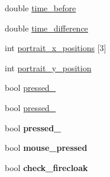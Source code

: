 \begin{DoxyCompactItemize}
\item 
double \hyperlink{classc__map_ab59ec9afe1f17edc59308fe5392b99bd}{time\-\_\-before}
\item 
double \hyperlink{classc__map_a7a1d7aaf2dafa841ec84f9b6aa256b5b}{time\-\_\-difference}
\item 
int \hyperlink{classc__map_aeb595cd9e54fd327225d36119f128496}{portrait\-\_\-x\-\_\-positions} \mbox{[}3\mbox{]}
\item 
int \hyperlink{classc__map_abd86f152d66885aa67f8ec22ac4b3bca}{portrait\-\_\-y\-\_\-position}
\item 
bool \hyperlink{classc__map_a05a4919684f8a4d6c10342f4e8231124}{pressed\-\_}
\item 
bool \hyperlink{classc__map_a0d69618264aff3f1b167d4fc3bb5ceb3}{pressed\-\_}
\item 
\hypertarget{classc__map_abdf89ab0f7c6595c01f70276dbaefc32}{bool {\bfseries pressed\-\_}}\label{classc__map_abdf89ab0f7c6595c01f70276dbaefc32}

\item 
\hypertarget{classc__map_af7479a56bab6a7b49c8c89bae2871605}{bool {\bfseries mouse\-\_\-pressed}}\label{classc__map_af7479a56bab6a7b49c8c89bae2871605}

\item 
\hypertarget{classc__map_ae3e456c5c75e2a280eb56d9a473b82b0}{bool {\bfseries check\-\_\-firecloak}}\label{classc__map_ae3e456c5c75e2a280eb56d9a473b82b0}


\end{DoxyCompactItemize}
